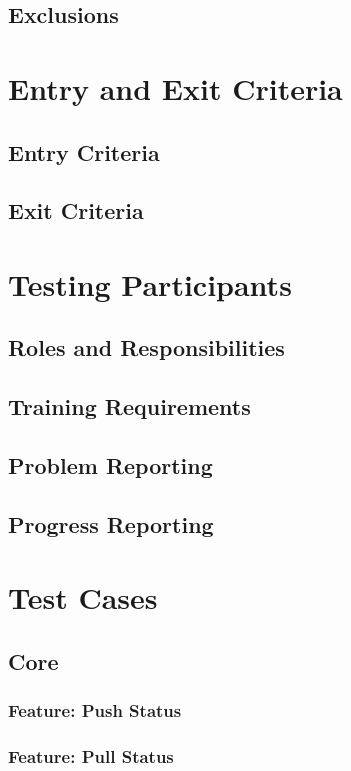 \documentclass[12pt]{article}
\begin{document}
\subsection{Exclusions}

\section{Entry and Exit Criteria}
\subsection{Entry Criteria}
\subsection{Exit Criteria}

\section{Testing Participants}
\subsection{Roles and Responsibilities}
\subsection{Training Requirements}
\subsection{Problem Reporting}
\subsection{Progress Reporting}

\section{Test Cases}

\subsection{Core}

\subsubsection{Feature: Push Status}
\subsubsection{Feature: Pull Status}
\end{document}
